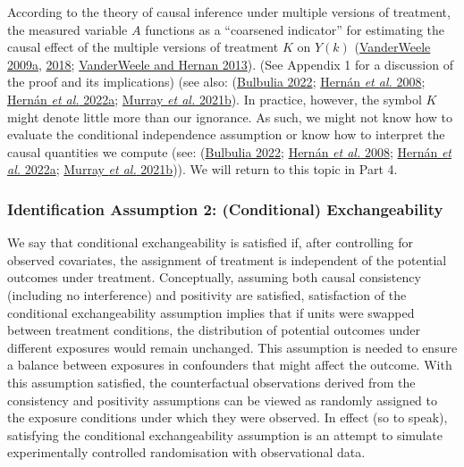 \documentclass[
  singlecolumn]{article}
\begin{document}
According to the theory of causal inference under multiple versions of
treatment, the measured variable \(A\) functions as a ``coarsened
indicator'' for estimating the causal effect of the multiple versions of
treatment \(K\) on \(Y(k)\)
(\protect\hyperlink{ref-vanderweele2009}{VanderWeele 2009a},
\protect\hyperlink{ref-vanderweele2018}{2018};
\protect\hyperlink{ref-vanderweele2013}{VanderWeele and Hernan 2013}).
(See Appendix 1 for a discussion of the proof and its implications) (see
also: (\protect\hyperlink{ref-bulbulia2022}{Bulbulia 2022};
\protect\hyperlink{ref-hernuxe1n2008}{Hernán \emph{et al.} 2008};
\protect\hyperlink{ref-hernuxe1n2022a}{Hernán \emph{et al.} 2022a};
\protect\hyperlink{ref-murray2021a}{Murray \emph{et al.} 2021b}). In
practice, however, the symbol \(K\) m️ight denote little more than our
ignorance. As such, we might not know how to evaluate the conditional
independence assumption or know how to interpret the causal quantities
we compute (see: (\protect\hyperlink{ref-bulbulia2022}{Bulbulia 2022};
\protect\hyperlink{ref-hernuxe1n2008}{Hernán \emph{et al.} 2008};
\protect\hyperlink{ref-hernuxe1n2022a}{Hernán \emph{et al.} 2022a};
\protect\hyperlink{ref-murray2021a}{Murray \emph{et al.} 2021b})). We
will return to this topic in Part 4.

\hypertarget{identification-assumption-2-conditional-exchangeability}{%
\subsubsection{Identification Assumption 2: (Conditional)
Exchangeability}\label{identification-assumption-2-conditional-exchangeability}}

We say that conditional exchangeability is satisfied if, after
controlling for observed covariates, the assignment of treatment is
independent of the potential outcomes under treatment. Conceptually,
assuming both causal consistency (including no interference) and
positivity are satisfied, satisfaction of the conditional
exchangeability assumption implies that if units were swapped between
treatment conditions, the distribution of potential outcomes under
different exposures would remain unchanged. This assumption is needed to
ensure a balance between exposures in confounders that might affect the
outcome. With this assumption satisfied, the counterfactual observations
derived from the consistency and positivity assumptions can be viewed as
randomly assigned to the exposure conditions under which they were
observed. In effect (so to speak), satisfying the conditional
exchangeability assumption is an attempt to simulate experimentally
controlled randomisation with observational data.
\end{document}
